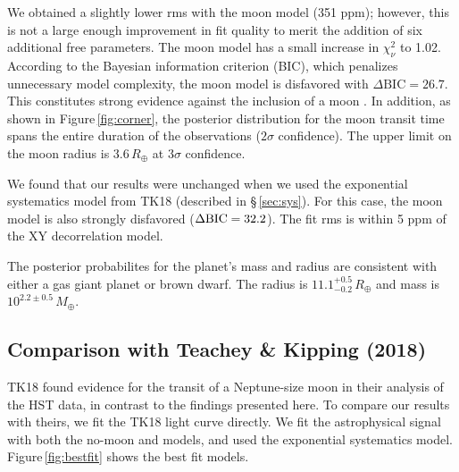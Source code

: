 \documentclass[twocolumn,trackchanges]{aastex62}
\begin{document}
We obtained a slightly lower rms with the moon model (351 ppm); however, this is not a large enough improvement in fit quality to merit the addition of six additional free parameters.  The moon model has a small increase in $\chi^2_\nu$ to 1.02. According to the Bayesian information criterion (BIC), which penalizes unnecessary model complexity, the moon model is disfavored with $\Delta\mathrm{BIC} = 26.7$. This constitutes strong evidence against the inclusion of a moon \citep{kass95}.  In addition, as shown in Figure\,\ref{fig:corner}, the posterior distribution for the moon transit time spans the entire duration of the observations ($2\sigma$ confidence).  The upper limit on the moon radius is $3.6\,R_\oplus$ at $3\sigma$ confidence.


We found that our results were unchanged when we used the exponential systematics model from TK18 (described in \S\,\ref{sec:sys}). For this case, the moon model is also strongly disfavored ($\Delta\rm{BIC} = 32.2$). The fit rms is within 5 ppm of the XY decorrelation model. 


The posterior probabilites for the planet's mass and radius are consistent with either a gas giant planet or brown dwarf. The radius is $11.1^{+0.5}_{-0.2}\,R_\oplus$ and mass is $10^{2.2\pm0.5}\, M_\oplus$.

\subsection{Comparison with Teachey \& Kipping (2018)}
TK18 found evidence for the transit of a Neptune-size moon in their analysis of the HST data, in contrast to the findings presented here.  To compare our results with theirs, we fit the TK18 light curve directly.  We fit the astrophysical signal with both the no-moon and models, and used the exponential systematics model.  Figure\,\ref{fig:bestfit} shows the best fit models. 

\end{document}
